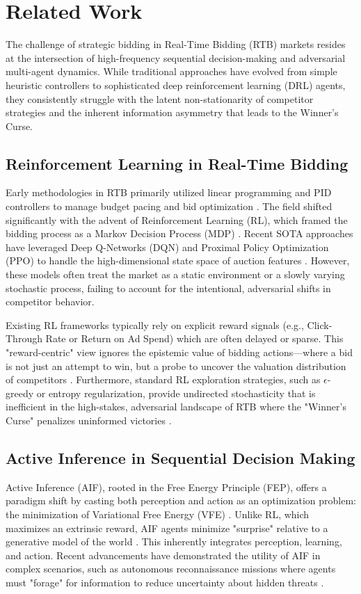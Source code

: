 \section{Related Work}

The challenge of strategic bidding in Real-Time Bidding (RTB) markets resides at the intersection of high-frequency sequential decision-making and adversarial multi-agent dynamics. While traditional approaches have evolved from simple heuristic controllers to sophisticated deep reinforcement learning (DRL) agents, they consistently struggle with the latent non-stationarity of competitor strategies and the inherent information asymmetry that leads to the Winner's Curse.

\subsection{Reinforcement Learning in Real-Time Bidding}
Early methodologies in RTB primarily utilized linear programming and PID controllers to manage budget pacing and bid optimization \cite{wu2015predicting, zhang2014real}. The field shifted significantly with the advent of Reinforcement Learning (RL), which framed the bidding process as a Markov Decision Process (MDP) \cite{cai2017real}. Recent SOTA approaches have leveraged Deep Q-Networks (DQN) and Proximal Policy Optimization (PPO) to handle the high-dimensional state space of auction features \cite{zou2019joint, feng2020deep}. However, these models often treat the market as a static environment or a slowly varying stochastic process, failing to account for the intentional, adversarial shifts in competitor behavior. 

Existing RL frameworks typically rely on explicit reward signals (e.g., Click-Through Rate or Return on Ad Spend) which are often delayed or sparse. This "reward-centric" view ignores the epistemic value of bidding actions—where a bid is not just an attempt to win, but a probe to uncover the valuation distribution of competitors \cite{ref_new_AdaptiveActiveI}. Furthermore, standard RL exploration strategies, such as $\epsilon$-greedy or entropy regularization, provide undirected stochasticity that is inefficient in the high-stakes, adversarial landscape of RTB where the "Winner's Curse" penalizes uninformed victories \cite{milosavljevic2020competition}.

\subsection{Active Inference in Sequential Decision Making}
Active Inference (AIF), rooted in the Free Energy Principle (FEP), offers a paradigm shift by casting both perception and action as an optimization problem: the minimization of Variational Free Energy (VFE) \cite{friston2010free}. Unlike RL, which maximizes an extrinsic reward, AIF agents minimize "surprise" relative to a generative model of the world \cite{friston2017active}. This inherently integrates perception, learning, and action. Recent advancements have demonstrated the utility of AIF in complex scenarios, such as autonomous reconnaissance missions where agents must "forage" for information to reduce uncertainty about hidden threats \cite{ref_new_ActiveInference}.

